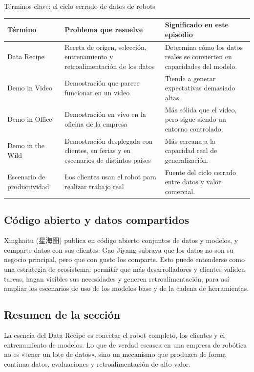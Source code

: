\begin{knowledgebox}{Términos clave: el ciclo cerrado de datos de robots}
\begin{tabularx}{\textwidth}{p{}p{}X}
\toprule
Término & Problema que resuelve & Significado en este episodio \\
\midrule
Data Recipe & Receta de origen, selección, entrenamiento y retroalimentación de los datos & Determina cómo los datos reales se convierten en capacidades del modelo. \\
Demo in Video & Demostración que parece funcionar en un video & Tiende a generar expectativas demasiado altas. \\
Demo in Office & Demostración en vivo en la oficina de la empresa & Más sólida que el video, pero sigue siendo un entorno controlado. \\
Demo in the Wild & Demostración desplegada con clientes, en ferias y en escenarios de distintos países & Más cercana a la capacidad real de generalización. \\
Escenario de productividad & Los clientes usan el robot para realizar trabajo real & Fuente del ciclo cerrado entre datos y valor comercial. \\
\bottomrule
\end{tabularx}
\end{knowledgebox}

\subsection{Código abierto y datos compartidos}

Xinghaitu (星海图) publica en código abierto conjuntos de datos y modelos, y comparte datos con sus clientes. Gao Jiyang subraya que los datos no son su negocio principal, pero que con gusto los comparte. Esto puede entenderse como una estrategia de ecosistema: permitir que más desarrolladores y clientes validen tareas, hagan visibles sus necesidades y generen retroalimentación, para así ampliar los escenarios de uso de los modelos base y de la cadena de herramientas.

\subsection{Resumen de la sección}

La esencia del Data Recipe es conectar el robot completo, los clientes y el entrenamiento de modelos. Lo que de verdad escasea en una empresa de robótica no es «tener un lote de datos», sino un mecanismo que produzca de forma continua datos, evaluaciones y retroalimentación de alto valor.
